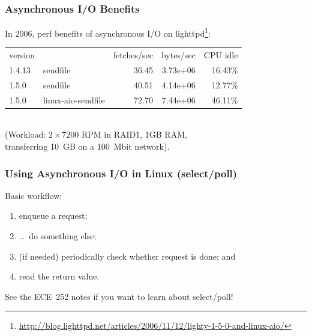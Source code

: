 \begin{frame}
  \frametitle{Asynchronous I/O Benefits}

  
    In 2006, perf benefits of asynchronous I/O on lighttpd\footnote{\tiny \url{http://blog.lighttpd.net/articles/2006/11/12/lighty-1-5-0-and-linux-aio/}}:\\

{\small
    \begin{tabular}{llrrr}
    version & & fetches/sec & bytes/sec & CPU idle \\
    1.4.13 & sendfile & 36.45 & 3.73e+06 & 16.43\% \\
    1.5.0 & sendfile & 40.51 & 4.14e+06 & 12.77\% \\
    1.5.0 & linux-aio-sendfile & 72.70 & 7.44e+06 & 46.11\% \\
    \end{tabular}
}~\\[1em]

    (Workload: $2\times 7200$ RPM in RAID1, 1GB RAM, \\
     \qquad transferring 10~GB on a 100~Mbit network).\\[1em]
  
\end{frame}


\begin{frame}
  \frametitle{Using Asynchronous I/O in Linux (select/poll)}


   Basic workflow: \\[1em]
   \begin{enumerate}
     \item enqueue a request;
     \item \ldots ~do something else;
     \item (if needed) periodically check whether request is done; and
     \item read the return value.
   \end{enumerate}

See the ECE~252 notes if you want to learn about select/poll!
  
\end{frame}





